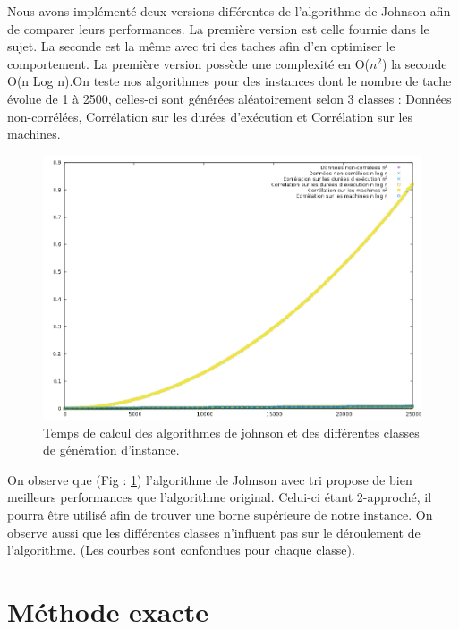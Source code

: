 \documentclass[12pt]{article}
\begin{document}
Nous avons implémenté deux versions différentes de l'algorithme de Johnson afin de comparer leurs performances. La première version est celle fournie dans le sujet. La seconde est la même avec tri des taches afin d'en optimiser le comportement. La première version possède une complexité en O($n^2$) la seconde O(n Log n).On teste nos algorithmes pour des instances dont le nombre de tache évolue de 1 à 2500, celles-ci sont générées aléatoirement selon 3 classes : Données non-corrélées, Corrélation sur les durées d'exécution et Corrélation sur les machines.\\

\begin{figure}[!ht]
\centering
\centerline{\includegraphics[scale=0.7]{johnson.png}}
\caption{Temps de calcul des algorithmes de johnson et des différentes classes de génération d'instance.}
\label{john}
\end{figure}

On observe que (Fig : \ref{john}) l'algorithme de Johnson avec tri propose de bien meilleurs performances que l'algorithme original.
Celui-ci étant 2-approché, il pourra être utilisé afin de trouver une borne supérieure de notre instance.
On observe aussi que les différentes classes n'influent pas sur le déroulement de l'algorithme. (Les courbes sont confondues pour chaque classe).

\clearpage
\newpage
\section{Méthode exacte}
\end{document}
